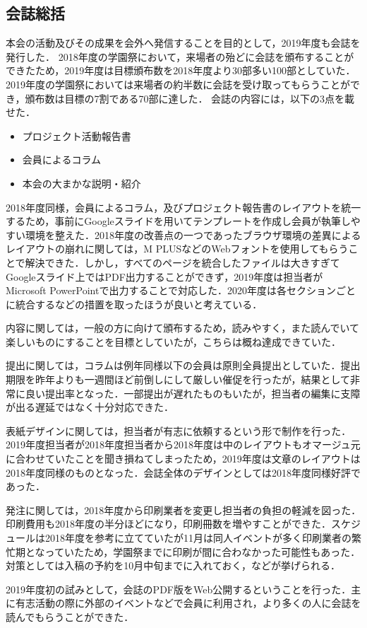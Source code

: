\subsection*{会誌総括}


本会の活動及びその成果を会外へ発信することを目的として，2019年度も会誌を発行した．
2018年度の学園祭において，来場者の殆どに会誌を頒布することができたため，2019年度は目標頒布数を2018年度より30部多い100部としていた．
2019年度の学園祭においては来場者の約半数に会誌を受け取ってもらうことができ，頒布数は目標の7割である70部に達した．
会誌の内容には，以下の3点を載せた．
\begin{itemize}
  \item プロジェクト活動報告書
  \item 会員によるコラム
  \item 本会の大まかな説明・紹介
\end{itemize}

2018年度同様，会員によるコラム，及びプロジェクト報告書のレイアウトを統一するため，事前にGoogleスライドを用いてテンプレートを作成し会員が執筆しやすい環境を整えた．2018年度の改善点の一つであったブラウザ環境の差異によるレイアウトの崩れに関しては，M PLUSなどのWebフォントを使用してもらうことで解決できた．しかし，すべてのページを統合したファイルは大きすぎてGoogleスライド上ではPDF出力することができず，2019年度は担当者がMicrosoft PowerPointで出力することで対応した．2020年度は各セクションごとに統合するなどの措置を取ったほうが良いと考えている．

内容に関しては，一般の方に向けて頒布するため，読みやすく，また読んでいて楽しいものにすることを目標としていたが，こちらは概ね達成できていた．

提出に関しては，コラムは例年同様\thirdgrade{}以下の会員は原則全員提出としていた．提出期限を昨年よりも一週間ほど前倒しにして厳しい催促を行ったが，結果として非常に良い提出率となった．一部提出が遅れたものもいたが，担当者の編集に支障が出る遅延ではなく十分対応できた．

表紙デザインに関しては，担当者が有志に依頼するという形で制作を行った．2019年度担当者が2018年度担当者から2018年度は中のレイアウトもオマージュ元に合わせていたことを聞き損ねてしまったため，2019年度は文章のレイアウトは2018年度同様のものとなった．会誌全体のデザインとしては2018年度同様好評であった．

発注に関しては，2018年度から印刷業者を変更し担当者の負担の軽減を図った．印刷費用も2018年度の半分ほどになり，印刷冊数を増やすことができた．スケジュールは2018年度を参考に立てていたが11月は同人イベントが多く印刷業者の繁忙期となっていたため，学園祭までに印刷が間に合わなかった可能性もあった．対策としては入稿の予約を10月中旬までに入れておく，などが挙げられる．

2019年度初の試みとして，会誌のPDF版をWeb公開するということを行った．主に有志活動の際に外部のイベントなどで会員に利用され，より多くの人に会誌を読んでもらうことができた．

